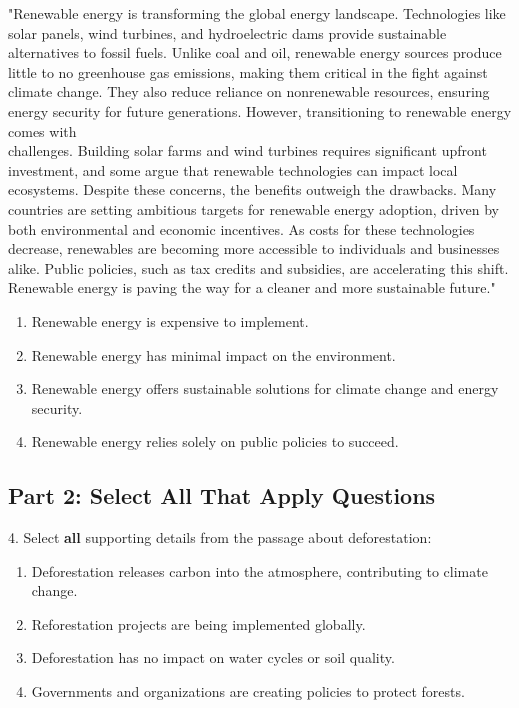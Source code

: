 \documentclass[12pt]{article}
\begin{document}
"Renewable energy is transforming the global energy landscape. Technologies like solar panels, wind turbines, and hydroelectric dams provide sustainable alternatives to fossil fuels. Unlike coal and oil, renewable energy sources produce little to no greenhouse gas emissions, making them critical in the fight against climate change. They also reduce reliance on nonrenewable resources, ensuring energy security for future generations. However, transitioning to renewable energy comes with \\challenges. Building solar farms and wind turbines requires significant upfront \\investment, and some argue that renewable technologies can impact local \\ecosystems. Despite these concerns, the benefits outweigh the drawbacks. Many countries are setting ambitious targets for renewable energy adoption, driven by both environmental and economic incentives. As costs for these technologies \\decrease, renewables are becoming more accessible to individuals and businesses alike. Public policies, such as tax credits and subsidies, are accelerating this shift. Renewable energy is paving the way for a cleaner and more sustainable future."  
\begin{enumerate}[label=\Alph*.]
    \item Renewable energy is expensive to implement.  
    \item Renewable energy has minimal impact on the environment.  
    \item Renewable energy offers sustainable solutions for climate change and energy security.  
    \item Renewable energy relies solely on public policies to succeed.  
\end{enumerate}


\subsection*{Part 2: Select All That Apply Questions}

4. Select \textbf{all} supporting details from the passage about deforestation:  
\begin{enumerate}[label=\Alph*.]
    \item Deforestation releases carbon into the atmosphere, contributing to climate \\change.  
    \item Reforestation projects are being implemented globally.  
    \item Deforestation has no impact on water cycles or soil quality.  
    \item Governments and organizations are creating policies to protect forests.  
\end{enumerate}
\end{document}
